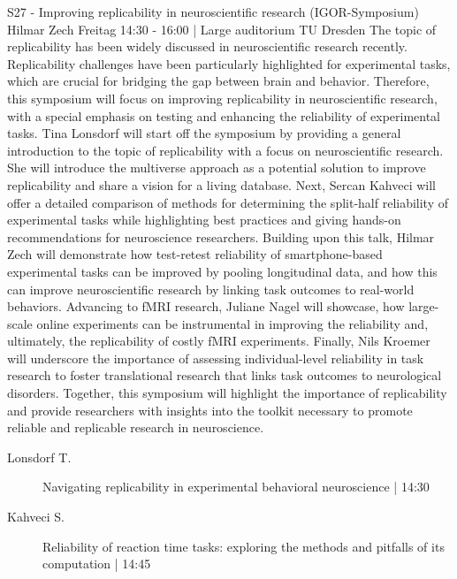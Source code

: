 
            \begin{symposium}
            {S27 - Improving replicability in neuroscientific research (IGOR-Symposium)}
            {Hilmar Zech}
            {Freitag 14:30 - 16:00 | Large auditorium}
            {TU Dresden}
            The topic of replicability has been widely discussed in neuroscientific research recently. Replicability challenges have been particularly highlighted for experimental tasks, which are crucial for bridging the gap between brain and behavior. Therefore, this symposium will focus on improving replicability in neuroscientific research, with a special emphasis on testing and enhancing the reliability of experimental tasks. Tina Lonsdorf will start off the symposium by providing a general introduction to the topic of replicability with a focus on neuroscientific research. She will introduce the multiverse approach as a potential solution to improve replicability and share a vision for a living database. Next, Sercan Kahveci will offer a detailed comparison of methods for determining the split-half reliability of experimental tasks while highlighting best practices and giving hands-on recommendations for neuroscience researchers. Building upon this talk, Hilmar Zech will demonstrate how test-retest reliability of smartphone-based experimental tasks can be improved by pooling longitudinal data, and how this can improve neuroscientific research by linking task outcomes to real-world behaviors. Advancing to fMRI research, Juliane Nagel will showcase, how large-scale online experiments can be instrumental in improving the reliability and, ultimately, the replicability of costly fMRI experiments. Finally, Nils Kroemer will underscore the importance of assessing individual-level reliability in task research to foster translational research that links task outcomes to neurological disorders. Together, this symposium will highlight the importance of replicability and provide researchers with insights into the toolkit necessary to promote reliable and replicable research in neuroscience.
            \begin{description}    
            
                \item [ Lonsdorf T.] Navigating replicability in experimental behavioral neuroscience \textcolor{mygray}{ | 14:30}    
                
                \item [ Kahveci S.] Reliability of reaction time tasks: exploring the methods and pitfalls of its computation \textcolor{mygray}{ | 14:45}    
                

\end{description}
\end{symposium}
